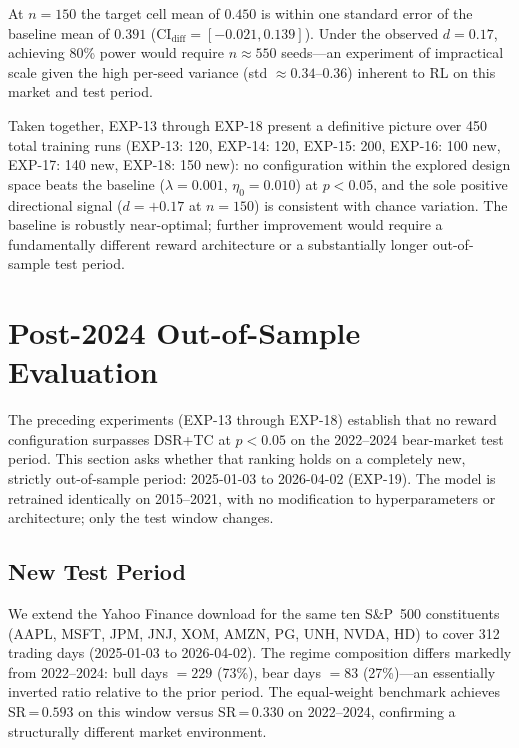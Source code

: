 \documentclass[conference]{IEEEtran}
\begin{document}
At $n=150$ the target cell mean of $0.450$ is within
one standard error of the baseline mean of $0.391$
(CI$_\text{diff}=[-0.021, 0.139]$). Under the observed
$d=0.17$, achieving 80\% power would require
$n\approx550$ seeds---an experiment of impractical
scale given the high per-seed variance
(std $\approx 0.34$--$0.36$) inherent to RL on this
market and test period.

Taken together, EXP-13 through EXP-18 present a
definitive picture over 450 total training runs
(EXP-13: 120, EXP-14: 120, EXP-15: 200,
EXP-16: 100 new, EXP-17: 140 new, EXP-18: 150 new):
no configuration within the explored design space
beats the baseline ($\lambda=0.001$, $\eta_0=0.010$)
at $p<0.05$, and the sole positive directional signal
($d=+0.17$ at $n=150$) is consistent with chance
variation. The baseline is robustly near-optimal;
further improvement would require a fundamentally
different reward architecture or a substantially
longer out-of-sample test period.

\section{Post-2024 Out-of-Sample Evaluation}
\label{sec:post2024}

The preceding experiments (EXP-13 through EXP-18) establish that
no reward configuration surpasses DSR+TC at $p<0.05$ on the
2022--2024 bear-market test period.
This section asks whether that ranking holds on a
completely new, strictly out-of-sample period: 2025-01-03
to 2026-04-02 (EXP-19). The model is retrained identically
on 2015--2021, with no modification to hyperparameters
or architecture; only the test window changes.

\subsection{New Test Period}

We extend the Yahoo Finance download for the same ten
S\&P~500 constituents
(AAPL, MSFT, JPM, JNJ, XOM, AMZN, PG, UNH, NVDA, HD)
to cover 312 trading days (2025-01-03 to 2026-04-02).
The regime composition differs markedly from 2022--2024:
bull days $= 229$ (73\%), bear days $= 83$ (27\%)---an
essentially inverted ratio relative to the prior period.
The equal-weight benchmark achieves SR\,=\,$0.593$ on this
window versus SR\,=\,$0.330$ on 2022--2024, confirming
a structurally different market environment.
\end{document}
